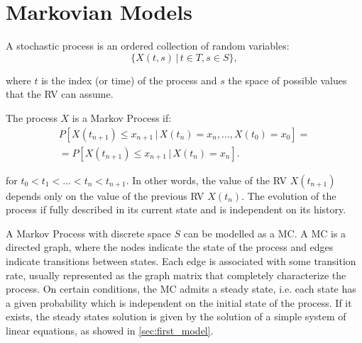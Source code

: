 \section{Markovian Models}
\label{sec:markov}

A stochastic process is an ordered collection of random variables:
\begin{equation*}
    \{X(t,s) \,|\, t \in T, s \in S\},
\end{equation*}

where $t$ is the index (or time) of the process and $s$ the space of possible values that the \ac{RV} can assume.

The process $X$ is a Markov Process if:
\begin{equation*}
    \begin{gathered}
        P[X(t_{n+1}) \leq x_{n+1} \,|\, X(t_n) = x_n, ... , X(t_0) = x_0] = \\
        = P[X(t_{n+1}) \leq x_{n+1} \,|\, X(t_n) = x_n].
    \end{gathered}
\end{equation*}

for $t_0 < t_1 < ... < t_n < t_{n+1}$.
In other words, the value of the \ac{RV} $X(t_{n+1})$ depends only on the value of the previous \ac{RV} $X(t_n)$.
The evolution of the process if fully described in its current state and is independent on its history.

A Markov Process with discrete space $S$ can be modelled as a \ac{MC}.
A \ac{MC} is a directed graph, where the nodes indicate the state of the process and edges indicate transitions between states.
Each edge is associated with some transition rate, usually represented as the graph matrix that completely characterize the process.
On certain conditions, the \ac{MC} admits a steady state, i.e. each state has a given probability which is independent on the initial state of the process.
If it exists, the steady states solution is given by the solution of a simple system of linear equations, as showed in \cref{sec:first_model}.
